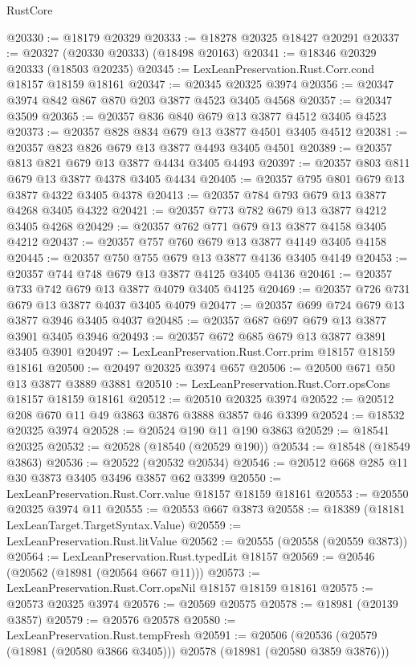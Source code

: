 \begin{lexlean}{RustCore}
\begin{coremodule}
@20330 := @18179 @20329
@20333 := @18278 @20325 @18427 @20291
@20337 := @20327 (@20330 @20333) (@18498 @20163)
@20341 := @18346 @20329 @20333 (@18503 @20235)
@20345 := LexLeanPreservation.Rust.Corr.cond @18157 @18159 @18161
@20347 := @20345 @20325 @3974
@20356 := @20347 @3974 @842 @867 @870 @203 @3877 @4523 @3405 @4568
@20357 := @20347 @3509
@20365 := @20357 @836 @840 @679 @13 @3877 @4512 @3405 @4523
@20373 := @20357 @828 @834 @679 @13 @3877 @4501 @3405 @4512
@20381 := @20357 @823 @826 @679 @13 @3877 @4493 @3405 @4501
@20389 := @20357 @813 @821 @679 @13 @3877 @4434 @3405 @4493
@20397 := @20357 @803 @811 @679 @13 @3877 @4378 @3405 @4434
@20405 := @20357 @795 @801 @679 @13 @3877 @4322 @3405 @4378
@20413 := @20357 @784 @793 @679 @13 @3877 @4268 @3405 @4322
@20421 := @20357 @773 @782 @679 @13 @3877 @4212 @3405 @4268
@20429 := @20357 @762 @771 @679 @13 @3877 @4158 @3405 @4212
@20437 := @20357 @757 @760 @679 @13 @3877 @4149 @3405 @4158
@20445 := @20357 @750 @755 @679 @13 @3877 @4136 @3405 @4149
@20453 := @20357 @744 @748 @679 @13 @3877 @4125 @3405 @4136
@20461 := @20357 @733 @742 @679 @13 @3877 @4079 @3405 @4125
@20469 := @20357 @726 @731 @679 @13 @3877 @4037 @3405 @4079
@20477 := @20357 @699 @724 @679 @13 @3877 @3946 @3405 @4037
@20485 := @20357 @687 @697 @679 @13 @3877 @3901 @3405 @3946
@20493 := @20357 @672 @685 @679 @13 @3877 @3891 @3405 @3901
@20497 := LexLeanPreservation.Rust.Corr.prim @18157 @18159 @18161
@20500 := @20497 @20325 @3974 @657
@20506 := @20500 @671 @50 @13 @3877 @3889 @3881
@20510 := LexLeanPreservation.Rust.Corr.opsCons @18157 @18159 @18161
@20512 := @20510 @20325 @3974
@20522 := @20512 @208 @670 @11 @49 @3863 @3876 @3888 @3857 @46 @3399
@20524 := @18532 @20325 @3974
@20528 := @20524 @190 @11 @190 @3863
@20529 := @18541 @20325
@20532 := @20528 (@18540 (@20529 @190))
@20534 := @18548 (@18549 @3863)
@20536 := @20522 (@20532 @20534)
@20546 := @20512 @668 @285 @11 @30 @3873 @3405 @3496 @3857 @62 @3399
@20550 := LexLeanPreservation.Rust.Corr.value @18157 @18159 @18161
@20553 := @20550 @20325 @3974 @11
@20555 := @20553 @667 @3873
@20558 := @18389 (@18181 LexLeanTarget.TargetSyntax.Value)
@20559 := LexLeanPreservation.Rust.litValue
@20562 := @20555 (@20558 (@20559 @3873))
@20564 := LexLeanPreservation.Rust.typedLit @18157
@20569 := @20546 (@20562 (@18981 (@20564 @667 @11)))
@20573 := LexLeanPreservation.Rust.Corr.opsNil @18157 @18159 @18161
@20575 := @20573 @20325 @3974
@20576 := @20569 @20575
@20578 := @18981 (@20139 @3857)
@20579 := @20576 @20578
@20580 := LexLeanPreservation.Rust.tempFresh
@20591 := @20506
    (@20536 (@20579 (@18981 (@20580 @3866 @3405))) @20578 (@18981 (@20580 @3859 @3876)))

\end{coremodule}
\end{lexlean}
